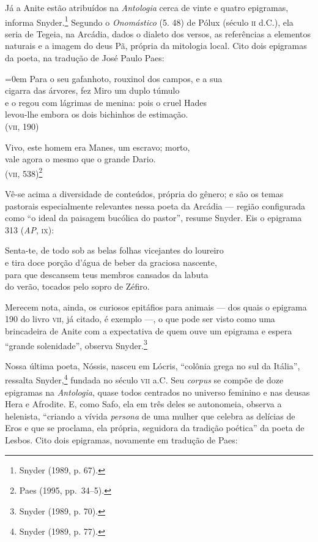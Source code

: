 Já a Anite estão atribuídos na \textit{Antologia} cerca de vinte e quatro
epigramas, informa Snyder.\footnote{ Snyder (1989, p. 67).} Segundo o \textit{Onomástico} (5. 48) de
Pólux (século \textsc{ii} d.C.), ela seria de Tegeia, na Arcádia, dados o dialeto dos
versos, as referências a elementos naturais e a imagem do deus Pã, própria da
mitologia local. Cito dois epigramas da poeta, na tradução de José Paulo Paes:

\begin{hedraquote}\parindent=0em 
Para o seu gafanhoto, rouxinol dos campos, e a sua\\
cigarra das árvores, fez Miro um duplo túmulo\\
e o regou com lágrimas de menina: pois o cruel Hades\\
levou-lhe embora os dois bichinhos de estimação.\\
\mbox{}\hfill (\textsc{vii}, 190)

\smallskip

Vivo, este homem era Manes, um escravo; morto,\\
vale agora o mesmo que o grande Dario.\\
\mbox{}\hfill (\textsc{vii}, 538)\footnote{ Paes (1995, pp.~34--5).}
\end{hedraquote}

Vê-se acima a diversidade de conteúdos, própria do gênero; e são os temas
pastorais especialmente relevantes nessa poeta da Arcádia --- região configurada
como “o ideal da paisagem bucólica do pastor”, resume Snyder. Eis o epigrama
313 (\textit{AP}, \textsc{ix}):

\begin{hedraquote}
Senta-te, de todo sob as belas folhas vicejantes do loureiro\\
e tira doce porção d’água de beber da graciosa nascente,\\
para que descansem teus membros cansados da labuta\\
do verão, tocados pelo sopro de Zéfiro.
\end{hedraquote}

Merecem nota, ainda, os curiosos epitáfios para animais --- dos quais o epigrama
190 do livro \textsc{vii}, já citado, é exemplo ---, o que pode ser visto como uma
brincadeira de Anite com a expectativa de quem ouve um epigrama e espera
“grande solenidade”, observa Snyder.\footnote{ Snyder (1989, p. 70).} 

Nossa última poeta, Nóssis, nasceu em Lócris, “colônia grega no sul da Itália”,
ressalta Snyder,\footnote{ Snyder (1989, p. 77).} fundada no século \textsc{vii} a.C. Seu \textit{corpus} se
compõe de doze epigramas na \textit{Antologia}, quase todos centrados no
universo feminino e nas deusas Hera e Afrodite. E, como Safo, ela em três deles
se autonomeia, observa a helenista, “criando a vívida \textit{persona} de uma
mulher que celebra as delícias de Eros e que se proclama, ela própria,
seguidora da tradição poética” da poeta de Lesbos. Cito dois epigramas,
novamente em tradução de Paes:

